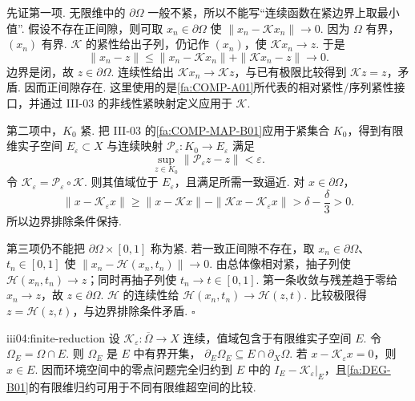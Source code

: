 \begin{FAProof}
先证第一项. 无限维中的 \(\displaystyle\partial\Omega\) 一般不紧，所以不能写“连续函数在紧边界上取最小值”. 假设不存在正间隙，则可取 \(\displaystyle x_n\in\partial\Omega\) 使
\(\displaystyle \|x_n-\mathcal Kx_n\|\longrightarrow0.\)
因为 \(\displaystyle\Omega\) 有界，\(\displaystyle(x_n)\) 有界. \(\displaystyle\mathcal K\) 的紧性给出子列，仍记作 \(\displaystyle(x_n)\)，使 \(\displaystyle\mathcal Kx_n\to z\). 于是
\[
\|x_n-z\|
\leqslant
\|x_n-\mathcal Kx_n\|+
\|\mathcal Kx_n-z\|
\longrightarrow0.
\]
边界是闭，故 \(\displaystyle z\in\partial\Omega\). 连续性给出 \(\displaystyle\mathcal Kx_n\to\mathcal Kz\)，与已有极限比较得到 \(\displaystyle\mathcal Kz=z\)，矛盾. 因而正间隙存在. 这里使用的是\autoref{fa:COMP-A01}所代表的相对紧性/序列紧性接口，并通过 III-03 的非线性紧映射定义应用于 \(\displaystyle\mathcal K\).

第二项中，\(\displaystyle K_0\) 紧. 把 III-03 的\autoref{fa:COMP-MAP-B01}应用于紧集合 \(\displaystyle K_0\)，得到有限维实子空间 \(\displaystyle E_{\varepsilon}\subset X\) 与连续映射 \(\displaystyle\mathcal P_{\varepsilon}:K_0\to E_{\varepsilon}\) 满足
\[
\sup_{z\in K_0}\|\mathcal P_{\varepsilon}z-z\|<\varepsilon.
\]
令 \(\displaystyle\mathcal K_{\varepsilon}=\mathcal P_{\varepsilon}\circ\mathcal K\). 则其值域位于 \(\displaystyle E_{\varepsilon}\)，且满足所需一致逼近. 对 \(\displaystyle x\in\partial\Omega\)，
\[
\|x-\mathcal K_{\varepsilon}x\|
\geqslant
\|x-\mathcal Kx\|-
\|\mathcal Kx-\mathcal K_{\varepsilon}x\|
>
\delta-\frac{\delta}{3}>0.
\]
所以边界排除条件保持.

第三项仍不能把 \(\displaystyle\partial\Omega\times[0,1]\) 称为紧. 若一致正间隙不存在，取 \(\displaystyle x_n\in\partial\Omega\)、\(\displaystyle t_n\in[0,1]\) 使 \(\displaystyle\|x_n-\mathcal H(x_n,t_n)\|\to0\). 由总体像相对紧，抽子列使 \(\displaystyle\mathcal H(x_n,t_n)\to z\)；同时再抽子列使 \(\displaystyle t_n\to t\in[0,1]\). 第一条收敛与残差趋于零给 \(\displaystyle x_n\to z\)，故 \(\displaystyle z\in\partial\Omega\). \(\displaystyle\mathcal H\) 的连续性给
\(\displaystyle \mathcal H(x_n,t_n) \longrightarrow \mathcal H(z,t).\)
比较极限得 \(\displaystyle z=\mathcal H(z,t)\)，与边界排除条件矛盾. \hfill\(\square\)
\end{FAProof}

\begin{FALemma}[B][有限维值域的相对边界与归约]{iii04:finite-reduction}
设 \(\displaystyle\mathcal K_{\varepsilon}:\overline\Omega\to X\) 连续，值域包含于有限维实子空间 \(\displaystyle E\). 令 \(\displaystyle\Omega_E=\Omega\cap E\). 则 \(\displaystyle\Omega_E\) 是 \(\displaystyle E\) 中有界开集，
\(\displaystyle \partial_E\Omega_E \subseteq E\cap\partial_X\Omega.\)
若 \(\displaystyle x-\mathcal K_{\varepsilon}x=0\)，则 \(\displaystyle x\in E\). 因而环境空间中的零点问题完全归约到 \(\displaystyle E\) 中的 \(\displaystyle I_E-\mathcal K_{\varepsilon}|_E\)，且\autoref{fa:DEG-B01}的有限维归约可用于不同有限维超空间的比较.
\end{FALemma}

